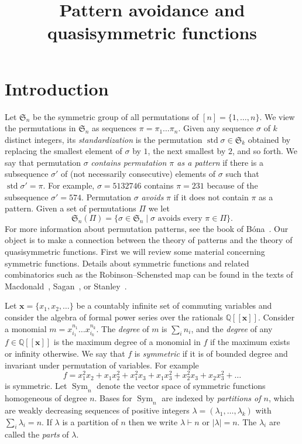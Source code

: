 \documentclass[ALCO,ThmDefs,Unicode,epreuves]{cedram}
\author{\firstname{Zachary} \lastname{Hamaker}}
\author{\firstname{Brendan} \lastname{Pawlowski}}
\author{\firstname{Bruce} \middlename{E.} \lastname{Sagan}}
\title[Pattern avoidance and quasisymmetric functions]{Pattern avoidance and quasisymmetric functions}
\DeclareMathOperator{\std}{std}
\newcommand{\ptn}{\vdash}
\newcommand{\la}{\lambda}
\newcommand{\si}{\sigma}
\newcommand{\bx}{\mathbf{x}}
\newcommand{\bbQ}{{\mathbb Q}}
\newcommand{\fS}{{\mathfrak S}}
\DeclareMathOperator{\Sym}{{Sym}}
\newcommand\llbracket{[\![}
\newcommand\rrbracket{]\!]}
\begin{document}
\maketitle




\section{Introduction}

Let $\fS_n$ be the symmetric group of all permutations of $[n]=\{1,\dots,n\}$. We view the permutations in $\fS_n$ as sequences $\pi=\pi_1\dots\pi_n$. Given any sequence $\si$ of $k$ distinct integers, its \emph{standardization} is the permutation $\std\si\in\fS_k$ obtained by replacing the smallest element of $\si$ by $1$, the next smallest by $2$, and so forth. We say that permutation $\si$ \emph{contains permutation $\pi$ as a pattern} if there is a subsequence $\si'$ of (not necessarily consecutive) elements of $\si$ such that $\std\si'=\pi$. For example, $\si=5132746$ contains $\pi=231$ because of the subsequence $\si'=574$.
Permutation $\si$ \emph{avoids} $\pi$ if it does not contain $\pi$ as a pattern. Given a set of permutations $\Pi$ we let 
\[
\fS_n(\Pi) =\{\si\in\fS_n \mid \text{$\si$ avoids every $\pi\in\Pi$}\}.
\]
For more information about permutation patterns, see the book of B\'ona~\cite{bon:cp}. Our object is to make a connection between the theory of patterns and the theory of quasisymmetric functions. First we will review some material concerning symmetric functions. Details about symmetric functions and related combinatorics such as the Robinson--Schensted map can be found in the texts of Macdonald~\cite{mac:sfh}, Sagan~\cite{sag:sym}, or Stanley~\cite{sta:ec2}.

Let $\bx=\{x_1,x_2,\dots\}$ be a countably infinite set of commuting variables and consider the algebra of formal power series over the rationals $\bbQ\llbracket \bx\rrbracket$. Consider a monomial $m=x_{i_1}^{n_1}\dots x_{i_k}^{n_k}$. The \emph{degree} of $m$ is $\sum_i n_i$, and the \emph{degree} of any $f\in\bbQ\llbracket \bx\rrbracket$ is the maximum degree of a monomial in $f$ if the maximum exists or infinity otherwise. We say that $f$ is \emph{symmetric} if it is of bounded degree and invariant under permutation of variables. 
For example
\[
f = x_1^2 x_2 + x_1 x_2^2 + x_1^2 x_3 + x_1 x_3^2 + x_2^2 x_3 + x_2 x_3^2 + \dots
\]
is symmetric.
Let $\Sym_n$ denote the vector space of symmetric functions homogeneous of degree $n$. Bases for $\Sym_n$ are indexed by \emph{partitions of $n$}, which are weakly decreasing sequences of positive integers $\la=(\la_1,\dots,\la_k)$ with $\sum_i \la_i=n$.
If $\la$ is a partition of $n$ then we write $\la\ptn n$ or $|\la|=n$. The $\la_i$ are called the \emph{parts} of $\la$.
\end{document}
